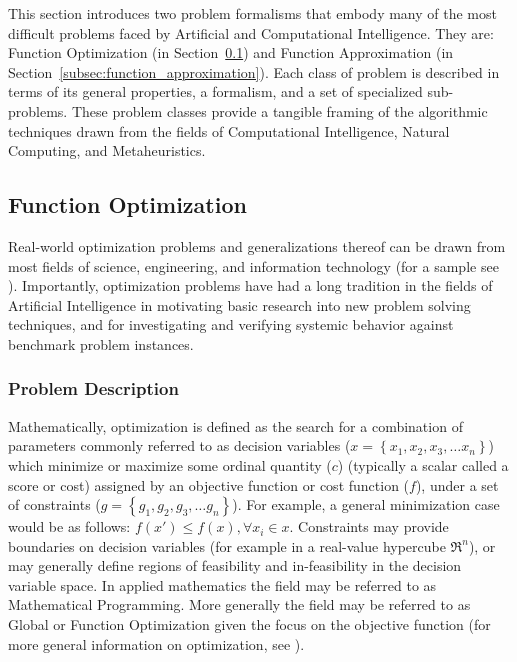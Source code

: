 \documentclass[a4paper, 11pt]{article}
\begin{document}
This section introduces two problem formalisms that embody many of the most difficult problems faced by Artificial and Computational Intelligence. They are: Function Optimization (in Section~\ref{subsec:function_optimization}) and Function Approximation (in Section~\ref{subsec:function_approximation}). Each class of problem is described in terms of its general properties, a formalism, and a set of specialized sub-problems. These problem classes provide a tangible framing of the algorithmic techniques drawn from the fields of Computational Intelligence, Natural Computing, and Metaheuristics.

% 
%
\subsection{Function Optimization}
\label{subsec:function_optimization}
Real-world optimization problems and generalizations thereof can be drawn from most fields of science, engineering, and information technology (for a sample see \cite{Ali1997, Toern1999}). Importantly, optimization problems have had a long tradition in the fields of Artificial Intelligence in motivating basic research into new problem solving techniques, and for investigating and verifying systemic behavior against benchmark problem instances.

%
%
\subsubsection{Problem Description}
Mathematically, optimization is defined as the search for a combination of parameters commonly referred to as decision variables ($x = \left\{x_1, x_2, x_3, \ldots x_n\right\}$) which minimize or maximize some ordinal quantity ($c$) (typically a scalar  called a score or cost) assigned by an objective function or cost function ($f$), under a set of constraints ($g = \left\{g_1, g_2, g_3, \ldots g_n\right\}$). For example, a general minimization case would be as follows: $f(x\prime) \leq f(x), \forall x_i \in x$. Constraints may provide boundaries on decision variables (for example in a real-value hypercube $\Re^n$), or may generally define regions of feasibility and in-feasibility in the decision variable space. In applied mathematics the field may be referred to as Mathematical Programming. More generally the field may be referred to as Global or Function Optimization given the focus on the objective function (for more general information on optimization, see \cite{Horst2000}). 
\end{document}
